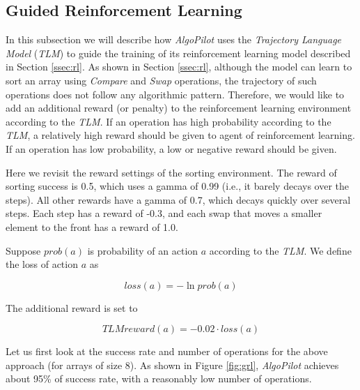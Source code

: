 \documentclass[pdflatex,sn-mathphys-num]{sn-jnl}%
\theoremstyle{thmstyleone}%
\theoremstyle{thmstyletwo}%
\theoremstyle{thmstylethree}%
\begin{document}
\subsection{Guided Reinforcement Learning} \label{ssec:grl}

In this subsection we will describe how \emph{AlgoPilot} uses the \emph{Trajectory Language Model} (\emph{TLM}) to guide the training of its reinforcement learning model described in Section \ref{ssec:rl}. As shown in Section \ref{ssec:rl}, although the model can learn to sort an array using \emph{Compare} and \emph{Swap} operations, the trajectory of such operations does not follow any algorithmic pattern. Therefore, we would like to add an additional reward (or penalty) to the reinforcement learning environment according to the \emph{TLM}. If an operation has high probability according to the \emph{TLM}, a relatively high reward should be given to agent of reinforcement learning. If an operation has low probability, a low or negative reward should be given.

Here we revisit the reward settings of the sorting environment. The reward of sorting success is 0.5, which uses a gamma of 0.99 (i.e., it barely decays over the steps). All other rewards have a gamma of 0.7, which decays quickly over several steps. Each step has a reward of -0.3, and each swap that moves a smaller element to the front has a reward of 1.0. 

Suppose $prob(a)$ is probability of an action $a$ according to the \emph{TLM}. We define the loss of action $a$ as

\begin{equation}
    loss(a) = -\ln{prob(a)}
\end{equation}

The additional reward is set to

\begin{equation*}
    TLMreward(a) = -0.02 \cdot loss(a)
\end{equation*}

Let us first look at the success rate and number of operations for the above approach (for arrays of size 8). As shown in Figure \ref{fig:grl}, \emph{AlgoPilot} achieves about 95\% of success rate, with a reasonably low number of operations.
\end{document}
